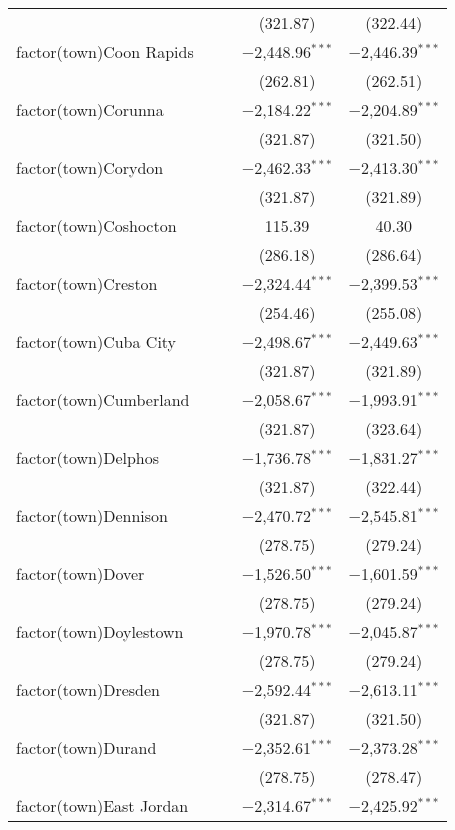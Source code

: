 \begin{table}[!htbp]
\begin{tabular}{@{\extracolsep{5pt}}lcccc}
  &  &  & (321.87) & (322.44) \\ 
  factor(town)Coon Rapids &  &  & $-$2,448.96$^{***}$ & $-$2,446.39$^{***}$ \\ 
  &  &  & (262.81) & (262.51) \\ 
  factor(town)Corunna &  &  & $-$2,184.22$^{***}$ & $-$2,204.89$^{***}$ \\ 
  &  &  & (321.87) & (321.50) \\ 
  factor(town)Corydon &  &  & $-$2,462.33$^{***}$ & $-$2,413.30$^{***}$ \\ 
  &  &  & (321.87) & (321.89) \\ 
  factor(town)Coshocton &  &  & 115.39 & 40.30 \\ 
  &  &  & (286.18) & (286.64) \\ 
  factor(town)Creston &  &  & $-$2,324.44$^{***}$ & $-$2,399.53$^{***}$ \\ 
  &  &  & (254.46) & (255.08) \\ 
  factor(town)Cuba City &  &  & $-$2,498.67$^{***}$ & $-$2,449.63$^{***}$ \\ 
  &  &  & (321.87) & (321.89) \\ 
  factor(town)Cumberland &  &  & $-$2,058.67$^{***}$ & $-$1,993.91$^{***}$ \\ 
  &  &  & (321.87) & (323.64) \\ 
  factor(town)Delphos &  &  & $-$1,736.78$^{***}$ & $-$1,831.27$^{***}$ \\ 
  &  &  & (321.87) & (322.44) \\ 
  factor(town)Dennison &  &  & $-$2,470.72$^{***}$ & $-$2,545.81$^{***}$ \\ 
  &  &  & (278.75) & (279.24) \\ 
  factor(town)Dover &  &  & $-$1,526.50$^{***}$ & $-$1,601.59$^{***}$ \\ 
  &  &  & (278.75) & (279.24) \\ 
  factor(town)Doylestown &  &  & $-$1,970.78$^{***}$ & $-$2,045.87$^{***}$ \\ 
  &  &  & (278.75) & (279.24) \\ 
  factor(town)Dresden &  &  & $-$2,592.44$^{***}$ & $-$2,613.11$^{***}$ \\ 
  &  &  & (321.87) & (321.50) \\ 
  factor(town)Durand &  &  & $-$2,352.61$^{***}$ & $-$2,373.28$^{***}$ \\ 
  &  &  & (278.75) & (278.47) \\ 
  factor(town)East Jordan &  &  & $-$2,314.67$^{***}$ & $-$2,425.92$^{***}$ \\ 

\end{tabular}
\end{table}
